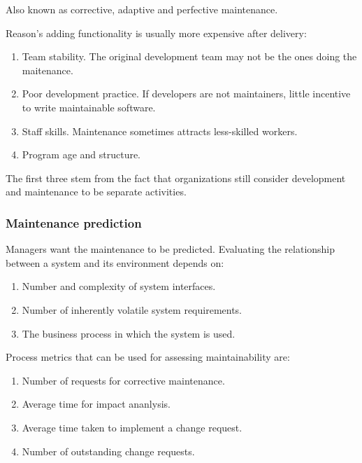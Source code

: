 \documentclass{article}
\begin{document}
Also known as corrective, adaptive and perfective maintenance.

Reason's adding functionality is usually more expensive after delivery:
\begin{enumerate}
    \item Team stability.  The original development team may not be the ones doing the maitenance.
    \item Poor development practice.  If developers are not maintainers, little incentive to write maintainable software.
    \item Staff skills.  Maintenance sometimes attracts less-skilled workers.
    \item Program age and structure.
\end{enumerate}
The first three stem from the fact that organizations still consider development and maintenance to be separate activities.


\subsubsection{Maintenance prediction}
Managers want the maintenance to be predicted.
Evaluating the relationship between a system and its environment depends on:
\begin{enumerate}
    \item Number and complexity of system interfaces.
    \item Number of inherently volatile system requirements.
    \item The business process in which the system is used.
\end{enumerate}

Process metrics that can be used for assessing maintainability are:
\begin{enumerate}
    \item Number of requests for corrective maintenance.
    \item Average time for impact ananlysis.
    \item Average time taken to implement a change request.
    \item Number of outstanding change requests.
\end{enumerate}
\end{document}
